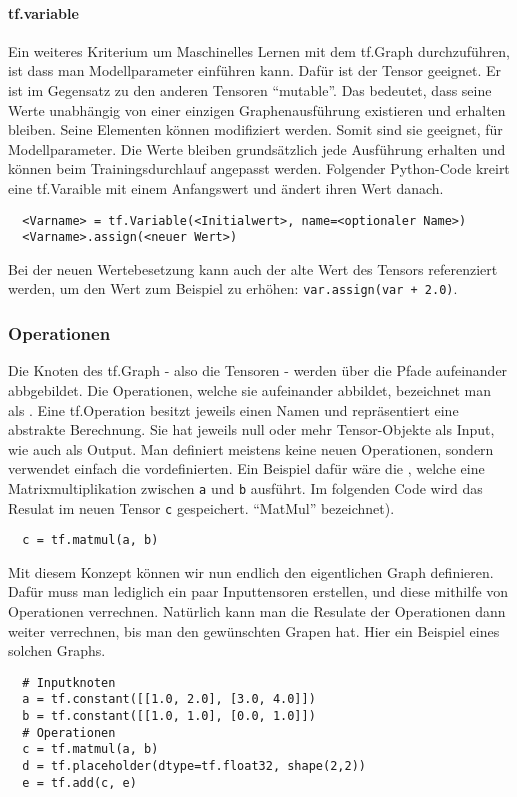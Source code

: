 \paragraph{tf.variable}
Ein weiteres Kriterium um Maschinelles Lernen mit dem tf.Graph durchzuführen,
ist dass man Modellparameter einführen kann. Dafür ist der
 Tensor geeignet. Er ist im Gegensatz zu den anderen
Tensoren ``mutable''. Das bedeutet, dass seine Werte unabhängig von einer
einzigen Graphenausführung existieren und erhalten bleiben. Seine Elementen
können modifiziert werden. Somit sind sie geeignet, für Modellparameter.
Die Werte bleiben grundsätzlich jede Ausführung erhalten und können beim
Trainingsdurchlauf angepasst werden.
\para{}
Folgender Python-Code kreirt eine tf.Varaible mit einem Anfangswert und ändert ihren Wert danach.
\begin{verbatim}
  <Varname> = tf.Variable(<Initialwert>, name=<optionaler Name>)
  <Varname>.assign(<neuer Wert>)
\end{verbatim}
Bei der neuen Wertebesetzung kann auch der alte Wert des Tensors referenziert
werden, um den Wert zum Beispiel zu erhöhen:
\texttt{var.assign(var + 2.0)}.

\subsubsection{Operationen}
Die Knoten des tf.Graph - also die Tensoren - werden über die Pfade aufeinander
abbgebildet. Die Operationen, welche sie aufeinander abbildet, bezeichnet man
als . Eine tf.Operation besitzt jeweils einen Namen und repräsentiert eine
abstrakte Berechnung. Sie hat jeweils null oder mehr Tensor-Objekte als
Input, wie auch als Output.
\para{}
Man definiert meistens keine neuen Operationen, sondern verwendet einfach die vordefinierten.
Ein Beispiel dafür wäre die , welche eine
Matrixmultiplikation zwischen \texttt{a} und \texttt{b}
ausführt. Im folgenden Code wird das Resulat im neuen Tensor
\texttt{c} gespeichert.
``MatMul'' bezeichnet).
\begin{verbatim}
  c = tf.matmul(a, b)
\end{verbatim}
\para{}
Mit diesem Konzept können wir nun endlich den eigentlichen Graph definieren.
Dafür muss man lediglich ein paar Inputtensoren erstellen, und diese mithilfe
von Operationen verrechnen. Natürlich kann man die Resulate der Operationen
dann weiter verrechnen, bis man den gewünschten Grapen hat.
\para{}
Hier ein Beispiel eines solchen Graphs.
\begin{verbatim}
  # Inputknoten
  a = tf.constant([[1.0, 2.0], [3.0, 4.0]])
  b = tf.constant([[1.0, 1.0], [0.0, 1.0]])
  # Operationen
  c = tf.matmul(a, b)
  d = tf.placeholder(dtype=tf.float32, shape(2,2))
  e = tf.add(c, e)
\end{verbatim}

